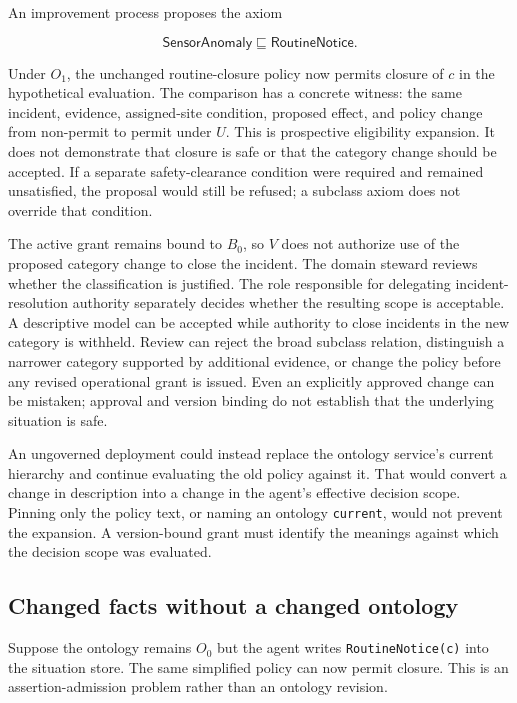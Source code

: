 \documentclass[
  english,
  12pt,
  a4paper,
  preprint,
  numbers,
  nopreprintline]{elsarticle}
\begin{document}
An improvement process proposes the axiom

\[ \mathsf{SensorAnomaly}\sqsubseteq\mathsf{RoutineNotice}. \]

Under \(O_1\), the unchanged routine-closure policy now permits closure
of \(c\) in the hypothetical evaluation. The comparison has a concrete
witness: the same incident, evidence, assigned-site condition, proposed
effect, and policy change from non-permit to permit under \(U\). This is
prospective eligibility expansion. It does not demonstrate that closure
is safe or that the category change should be accepted. If a separate
safety-clearance condition were required and remained unsatisfied, the
proposal would still be refused; a subclass axiom does not override that
condition.

The active grant remains bound to \(B_0\), so \(V\) does not authorize
use of the proposed category change to close the incident. The domain
steward reviews whether the classification is justified. The role
responsible for delegating incident-resolution authority separately
decides whether the resulting scope is acceptable. A descriptive model
can be accepted while authority to close incidents in the new category
is withheld. Review can reject the broad subclass relation, distinguish
a narrower category supported by additional evidence, or change the
policy before any revised operational grant is issued. Even an
explicitly approved change can be mistaken; approval and version binding
do not establish that the underlying situation is safe.

An ungoverned deployment could instead replace the ontology service's
current hierarchy and continue evaluating the old policy against it.
That would convert a change in description into a change in the agent's
effective decision scope. Pinning only the policy text, or naming an
ontology \texttt{current}, would not prevent the expansion. A
version-bound grant must identify the meanings against which the
decision scope was evaluated.

\subsection{Changed facts without a changed
ontology}\label{changed-facts-without-a-changed-ontology}

Suppose the ontology remains \(O_0\) but the agent writes
\texttt{RoutineNotice(c)} into the situation store. The same simplified
policy can now permit closure. This is an assertion-admission problem
rather than an ontology revision.
\end{document}
